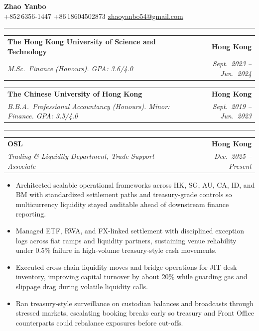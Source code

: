 \documentclass[9pt,a4paper]{extarticle}
\makeatletter
\newcommand{\ressection}[1]{%
  \vspace{0.8em}%
  \noindent{\large\scshape\bfseries #1}\par\nobreak
  \vspace{-\parskip}%
  \vspace{-\parskip}%
  \vspace{-\parskip}%
  \vspace{-\parskip}%
  \noindent\rule{\linewidth}{0.1pt}\par\nobreak
  \vspace{-\parskip}%
}
\newcommand{\resumeSubheading}[4]{%
  \vspace{0.6em}%
  \begin{tabular*}{\textwidth}{l@{\extracolsep{\fill}}r}
    \textbf{#1} & \textbf{#2} \\
    \textit{\small #3} & \textit{\small #4} \\
  \end{tabular*}\vspace{0.32em}}
\makeatother
\begin{document}
\begin{center}
  {\LARGE\bfseries Zhao Yanbo}\\[0.35em]
  \small
  +852\,6356-1447 \;\textbar\;
  +86\,18604502873 \;\textbar\;
  \href{mailto:zhaoyanbo54@gmail.com}{zhaoyanbo54@gmail.com}
\end{center}
\vspace{-0.2em}

\ressection{Education}

\resumeSubheading{The Hong Kong University of Science and Technology}{Hong Kong}{M.Sc.\ Finance (Honours). GPA: 3.6/4.0}{Sept.\ 2023 -- Jun.\ 2024}

\resumeSubheading{The Chinese University of Hong Kong}{Hong Kong}{B.B.A.\ Professional Accountancy (Honours). Minor: Finance. GPA: 3.5/4.0}{Sept.\ 2019 -- Jun.\ 2023}

\ressection{Work Experience}

\resumeSubheading{OSL}{Hong Kong}{Trading \& Liquidity Department, Trade Support Associate}{Dec.\ 2025 -- Present}
\begin{itemize}
  \item Architected scalable operational frameworks across HK, SG, AU, CA, ID, and BM with standardized settlement paths and treasury-grade controls so multicurrency liquidity stayed auditable ahead of downstream finance reporting.
  \item Managed ETF, RWA, and FX-linked settlement with disciplined exception logs across fiat ramps and liquidity partners, sustaining venue reliability under 0.5\% failure in high-volume treasury-style cash movements.
  \item Executed cross-chain liquidity moves and bridge operations for JIT desk inventory, improving capital turnover by about 20\% while guarding gas and slippage drag during volatile liquidity calls.
  \item Ran treasury-style surveillance on custodian balances and broadcasts through stressed markets, escalating booking breaks early so treasury and Front Office counterparts could rebalance exposures before cut-offs.
\end{itemize}
\end{document}
